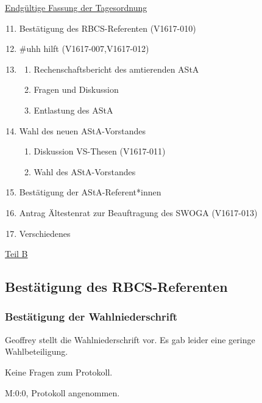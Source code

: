 \documentclass[ngerman,headheight=70pt]{scrartcl}
\begin{document}
    \underline{Endgültige Fassung der Tagesordnung}
    \begin{enumerate}[label={\textbf{Top \theenumi}},leftmargin=*]
        \setcounter{enumi}{10}
        \item Bestätigung des RBCS-Referenten (V1617-010)
        \item \#uhh hilft (V1617-007,V1617-012)
        \item
            \begin{enumerate}
                \item Rechenschaftsbericht des amtierenden AStA
                \item Fragen und Diskussion
                \item Entlastung des AStA
            \end{enumerate}
        \item Wahl des neuen AStA-Vorstandes
            \begin{enumerate}
                \item Diskussion VS-Thesen (V1617-011)
                \item Wahl des AStA-Vorstandes
            \end{enumerate}
        \item Bestätigung der AStA-Referent*innen
        \item Antrag Ältestenrat zur Beauftragung des SWOGA (V1617-013)
        \item Verschiedenes
    \end{enumerate}

    \setcounter{subsection}{10}
    \vspace{1cm}
    {\Large \underline{Teil B}}

    \subsection{Bestätigung des RBCS-Referenten}

    \subsubsection{Bestätigung der Wahlniederschrift}

    Geoffrey stellt die Wahlniederschrift vor. Es gab leider eine geringe
    Wahlbeteiligung.

    Keine Fragen zum Protokoll.

    M:0:0, Protokoll angenommen.
\end{document}
